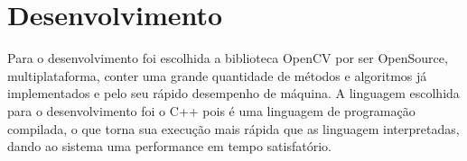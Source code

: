 	
	\chapter{Desenvolvimento} 
	
			Para o desenvolvimento foi escolhida a biblioteca OpenCV por ser OpenSource, multiplataforma, conter uma grande quantidade de métodos e algoritmos já implementados	e pelo seu rápido desempenho de máquina.
			A linguagem escolhida para o desenvolvimento foi o C++ pois é uma linguagem de programação compilada, o que torna sua execução mais rápida que as linguagem interpretadas, dando ao sistema uma performance em tempo satisfatório.	

